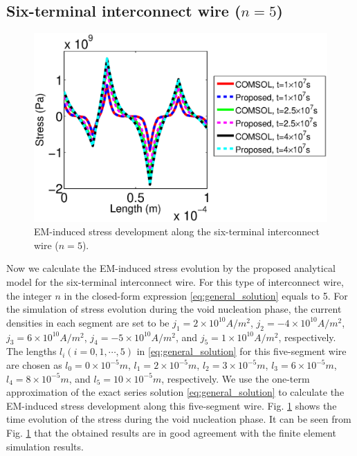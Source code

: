 \subsection{Six-terminal interconnect wire ($n=5$)}
\begin{figure}[!h]
\centering
\includegraphics[width=0.9\columnwidth]{S5StressMatComCompareT0.eps}
\caption{EM-induced stress development along the six-terminal interconnect wire ($n=5$).}
\label{fig:S5StressMatComCompare}
\end{figure}
Now we calculate the EM-induced stress evolution by the proposed analytical model for the six-terminal interconnect wire. For this type of interconnect wire, the integer $n$ in the closed-form expression \eqref{eq:general_solution} equals to 5. For the simulation of stress evolution during the void nucleation phase, the current densities in each segment are set to be $j_1=2\times 10^{10}A/m^2$, $j_2=-4\times 10^{10}A/m^2$, $j_3=6\times 10^{10}A/m^2$, $j_4=-5\times 10^{10}A/m^2$, and $j_5=1\times 10^{10}A/m^2$, respectively. The lengths $l_i(i=0,1,\cdots,5)$ in \eqref{eq:general_solution} for this five-segment wire are chosen as $l_0=0\times 10^{-5}m$, $l_1=2\times 10^{-5}m$, $l_2=3\times 10^{-5}m$, $l_3=6\times 10^{-5}m$, $l_4=8\times 10^{-5}m$, and $l_5=10\times 10^{-5}m$, respectively. We use the one-term approximation of the exact series solution \eqref{eq:general_solution} to calculate the EM-induced stress development along this five-segment wire. Fig. \ref{fig:S5StressMatComCompare} shows the time evolution of the stress during the void nucleation phase. It can be seen from Fig. \ref{fig:S5StressMatComCompare} that the obtained results are in good agreement with the finite element simulation results.

